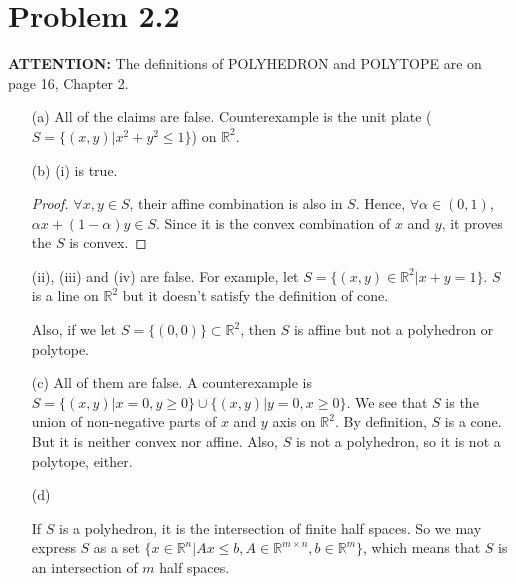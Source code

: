 \documentclass[12pt]{article}
\begin{document}
\section*{Problem 2.2}

\textbf{\color{red}ATTENTION: } The definitions of POLYHEDRON and POLYTOPE are on page 16, Chapter 2.

\begin{enumerate}
\item [(a)]
All of the claims are false. Counterexample is the unit plate ($S = \{(x, y) | x^2 + y^2 \leqslant 1\}$) on $\mathbb{R}^2$.

\vspace{50mm}

\item [(b)]
(i) is true. 
\begin{proof}

$\forall x, y \in S$, their affine combination is also in $S$. Hence, $\forall \alpha \in (0, 1)$, $\alpha x + (1-\alpha) y \in S$. Since it is the convex combination of $x$ and $y$, it proves the $S$ is convex.

\end{proof}

(ii), (iii) and (iv) are false. For example, let $S = \{(x, y) \in \mathbb{R}^2 | x + y = 1\}$. $S$ is a line on $\mathbb{R}^2$ but it doesn't satisfy the definition of cone. 

Also, if we let $S = \{(0, 0)\} \subset \mathbb{R}^2$, then $S$ is affine but not a polyhedron or polytope.

\vspace{50mm}

\item[(c)] 
All of them are false. A counterexample is $S = \{(x, y)| x = 0, y \geqslant 0 
\} \cup \{(x, y)| y = 0, x \geqslant 0 \} $. We see that $S$ is the union of non-negative parts of $x$ and $y$ axis on $\mathbb{R}^2$. By definition, $S$ is a cone. But it is neither convex nor affine. Also, $S$ is not a polyhedron, so it is not a polytope, either. 

\vspace{50mm}

\item [(d)]

If $S$ is a polyhedron, it is the intersection of finite half spaces. So we may express $S$ as a set $\{x\in \mathbb{R}^n | Ax \leqslant b, A\in \mathbb{R}^{m\times n}, b\in\mathbb{R}^m \}$, which means that $S$ is an intersection of $m$ half spaces.


\end{enumerate}
\end{document}
